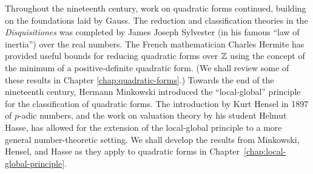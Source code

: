 Throughout the nineteenth century, work on quadratic forms continued, building on the foundations laid by Gauss. The reduction and classification theories in the \emph{Disquisitiones} was completed by James Joseph Sylvester (in his famous ``law of inertia'') over the real numbers. The French mathematician Charles Hermite has provided useful bounds for reducing quadratic forms over \(\mathbb{Z}\) using the concept of the minimum of a positive-definite quadratic form. \cite{gerstein2008basic} (We shall review some of these results in Chapter \ref{chap:quadratic-forms}.) Towards the end of the nineteenth century, Hermann Minkowski introduced the ``local-global'' principle for the classification of quadratic forms. The introduction by Kurt Hensel in 1897 of \(p\)-adic numbers, and the work on valuation theory by his student Helmut Hasse, has allowed for the extension of the local-global principle to a more general number-theoretic setting. \cite{gerstein2008basic,hensel1913zahlentheorie,hasse1922uber} We shall develop the results from Minkowski, Hensel, and Hasse as they apply to quadratic forms in Chapter \,\ref{chap:local-global-principle}.
